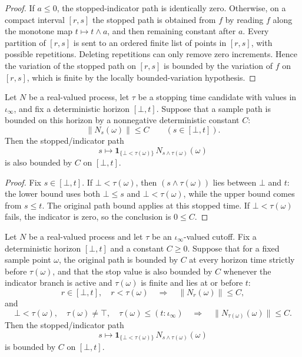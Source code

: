 \begin{proof}

\leanok
If \(a\le 0\), the stopped-indicator path is identically zero.  Otherwise,
on a compact interval \([r,s]\) the stopped path is obtained from \(f\) by
reading \(f\) along the monotone map \(t\mapsto t\wedge a\), and then
remaining constant after \(a\).  Every partition of \([r,s]\) is sent to an
ordered finite list of points in \([r,s]\), with possible repetitions.
Deleting repetitions can only remove zero increments.  Hence the variation
of the stopped path on \([r,s]\) is bounded by the variation of \(f\) on
\([r,s]\), which is finite by the locally bounded-variation hypothesis.
\end{proof}


\begin{lemma}\label{lem:stoppedProcess_indicator_bound_on_Icc}
Let \(N\) be a real-valued process, let \(\tau\) be a stopping time candidate
with values in \(\iota_\infty\), and fix a deterministic horizon
\([\bot,t]\).  Suppose that a sample path is bounded on this horizon by a
nonnegative deterministic constant \(C\):
\[
  \|N_s(\omega)\|\le C\qquad(s\in[\bot,t]).
\]
Then the stopped/indicator path
\[
  s\longmapsto
  \mathbf 1_{\{\bot<\tau(\omega)\}}\,
  N_{s\wedge\tau(\omega)}(\omega)
\]
is also bounded by \(C\) on \([\bot,t]\).
\end{lemma}

\begin{proof}
Fix \(s\in[\bot,t]\).  If \(\bot<\tau(\omega)\), then
\((s\wedge\tau(\omega))\) lies between \(\bot\) and \(t\): the lower bound
uses both \(\bot\le s\) and \(\bot<\tau(\omega)\), while the upper bound
comes from \(s\le t\).  The original path bound applies at this stopped
time.  If \(\bot<\tau(\omega)\) fails, the indicator is zero, so the
conclusion is \(0\le C\).
\end{proof}


\begin{lemma}\label{lem:stoppedProcess_indicator_bound_on_Icc_of_pre_stop_bound}
Let \(N\) be a real-valued process and let \(\tau\) be an
\(\iota_\infty\)-valued cutoff.  Fix a deterministic horizon \([\bot,t]\)
and a constant \(C\ge0\).  Suppose that for a fixed sample point \(\omega\),
the original path is bounded by \(C\) at every horizon time strictly before
\(\tau(\omega)\), and that the stop value is also bounded by \(C\) whenever
the indicator branch is active and \(\tau(\omega)\) is finite and lies at or
before \(t\):
\[
  r\in[\bot,t],\quad r<\tau(\omega)
  \quad\Longrightarrow\quad
  \|N_r(\omega)\|\le C,
\]
and
\[
  \bot<\tau(\omega),\quad \tau(\omega)\ne\top,\quad
  \tau(\omega)\le (t:\iota_\infty)
  \quad\Longrightarrow\quad
  \|N_{\tau(\omega)}(\omega)\|\le C .
\]
Then the stopped/indicator path
\[
  s\longmapsto
  \mathbf 1_{\{\bot<\tau(\omega)\}}\,
  N_{s\wedge\tau(\omega)}(\omega)
\]
is bounded by \(C\) on \([\bot,t]\).
\end{lemma}

